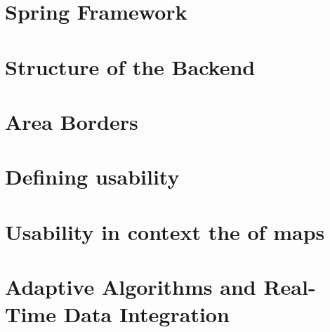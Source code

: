 \section{Spring Framework}


\section{Structure of the Backend}


\section{Area Borders}


\section{Defining usability}


\section{Usability in context the of maps}



\newpage
\section{Adaptive Algorithms and Real-Time Data Integration}


